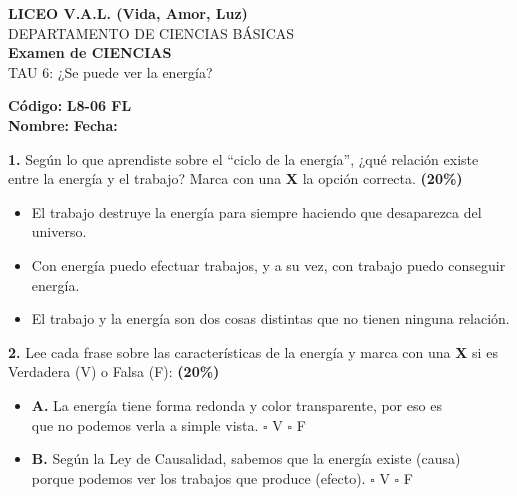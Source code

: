 \documentclass[12pt, letterpaper]{article}
\newif\ifshowanswers
\newcommand{\casillaVerdadera}{\ifshowanswers \textcolor{blue}{$\blacksquare$} \else $\square$ \fi}
\newcommand{\casillaFalsa}{\ifshowanswers $\square$ \else $\square$ \fi}
\begin{document}
	
	\begin{center} 
		{\Large \textbf{LICEO V.A.L. (Vida, Amor, Luz)}}\\[0.1cm] 
		{\large DEPARTAMENTO DE CIENCIAS BÁSICAS}\\[0.1cm] 
		\textbf{Examen de CIENCIAS }\\[0.1cm] 
		TAU 6: ¿Se puede ver la energía? 
	\end{center}
	
	\vspace{0.3cm}
	\hfill \textbf{Código:} \textbf{L8-06 FL}\\
	\noindent \textbf{Nombre:} \underline{\hspace{8cm}} \hspace{1cm}\textbf{Fecha:} \underline{\hspace{3cm}}
	
	\vspace{0.8cm}
	\noindent \textbf{1.} Según lo que aprendiste sobre el ``ciclo de la energía'', ¿qué relación existe entre la energía y el trabajo? Marca con una \textbf{X} la opción correcta. \hfill\textbf{(20\%)}
	
	\vspace{0.3cm} 
	\begin{itemize}[itemsep=0.4cm] 
		\item[ \casillaFalsa ] El trabajo destruye la energía para siempre haciendo que desaparezca del universo. 
		\item[ \casillaVerdadera ] Con energía puedo efectuar trabajos, y a su vez, con trabajo puedo conseguir energía. 
		\item[ \casillaFalsa ] El trabajo y la energía son dos cosas distintas que no tienen ninguna relación. 
	\end{itemize}
	
	\vspace{0.5cm}
	\noindent \textbf{2.} Lee cada frase sobre las características de la energía y marca con una \textbf{X} si es Verdadera (V) o Falsa (F): \hfill\textbf{(20\%)}
	
	\vspace{0.3cm} 
	\begin{itemize}[itemsep=0.6cm, label={}] 
		\item \textbf{A.} La energía tiene forma redonda y color transparente, por eso es\\ que no podemos verla a simple vista. \hfill  \casillaFalsa  V \quad  \casillaVerdadera  F 
		\item \textbf{B.} Según la Ley de Causalidad, sabemos que la energía existe (causa)\\ porque podemos ver los trabajos que produce (efecto). \hfill  \casillaVerdadera  V \quad  \casillaFalsa  F 
	\end{itemize}
	
\end{document}
